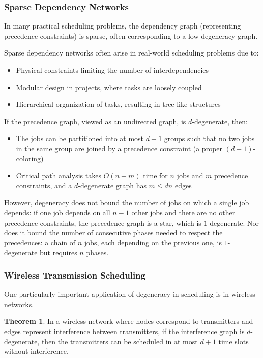 \documentclass{article}
\theoremstyle{definition}
\newtheorem{theorem}{Theorem}
\begin{document}
\subsubsection*{Sparse Dependency Networks}

In many practical scheduling problems, the dependency graph (representing precedence constraints) is sparse, often corresponding to a low-degeneracy graph.

Sparse dependency networks often arise in real-world scheduling problems due to:
\begin{itemize}
    \item Physical constraints limiting the number of interdependencies
    \item Modular design in projects, where tasks are loosely coupled
    \item Hierarchical organization of tasks, resulting in tree-like structures
\end{itemize}


If the precedence graph, viewed as an undirected graph, is $d$-degenerate, then:
\begin{itemize}
    \item The jobs can be partitioned into at most $d+1$ groups such that no two jobs in the same group are joined by a precedence constraint (a proper $(d+1)$-coloring)
    \item Critical path analysis takes $O(n + m)$ time for $n$ jobs and $m$ precedence constraints, and a $d$-degenerate graph has $m \leq dn$ edges
\end{itemize}
However, degeneracy does not bound the number of jobs on which a single job depends: if one job depends on all $n-1$ other jobs and there are no other precedence constraints, the precedence graph is a star, which is $1$-degenerate. Nor does it bound the number of consecutive phases needed to respect the precedences: a chain of $n$ jobs, each depending on the previous one, is $1$-degenerate but requires $n$ phases.
\subsubsection*{Wireless Transmission Scheduling}
One particularly important application of degeneracy in scheduling is in wireless networks.

\begin{theorem}
In a wireless network where nodes correspond to transmitters and edges represent interference between transmitters, if the interference graph is $d$-degenerate, then the transmitters can be scheduled in at most $d+1$ time slots without interference.
\end{theorem}
\end{document}
